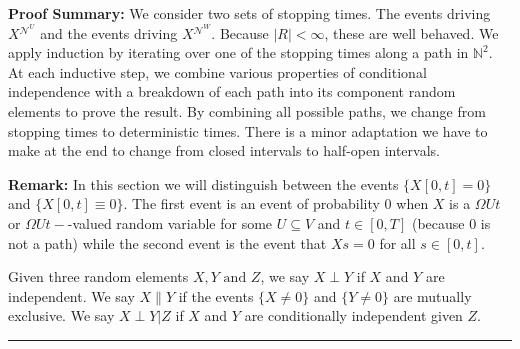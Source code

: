 \documentclass[12pt]{article}
\newcommand{\skipLine}{\vspace{12pt}}
\newcommand{\mb}{\mathbb}
\newcommand{\mc}{\mathcal}
\newcommand{\te}{\text}
\newcommand{\pfsum}{\textbf{Proof Summary: }}
\newcommand{\ind}{\hspace{24pt}}
\newcommand{\lin}{\rule{\linewidth}{0.4 pt}}
\renewcommand{\U}{U}							%
\newcommand{\UU}{W}								%
\newcommand{\UUU}{R}							%
\newcommand{\T}{T}								%
\renewcommand{\t}{t}							%
\renewcommand{\tt}{s}							%
\newcommand{\X}{X}								%
\newcommand{\neigh}{\mc{N}}						%
\newcommand{\vind}[1]{^{#1}}					%
\newcommand{\XX}{Y}								%
\newcommand{\XXX}{Z}							%
\newcommand{\mutex}{\|}							%
\begin{document}
\pfsum We consider two sets of stopping times. The events driving \(\X{}{}^{\neigh\vind{\U}}\) and the events driving \(\X{}{}^{\neigh\vind{\UU}}\). Because \(|\UUU| < \infty\), these are well behaved. We apply induction by iterating over one of the stopping times along a path in \(\mb{N}^2\). At each inductive step, we combine various properties of conditional independence with a breakdown of each path into its component random elements to prove the result. By combining all possible paths, we change from stopping times to deterministic times. There is a minor adaptation we have to make at the end to change from closed intervals to half-open intervals.

\skipLine

\textbf{Remark:} In this section we will distinguish between the events \(\{\X{}{[0,\t]} = 0\}\) and \(\{\X{}{[0,\t]}\equiv 0\}\). The first event is an event of probability 0 when \(\X{}{}\) is a \(\Omega{\U}{\t}\) or \(\Omega{\U}{\t-}\)-valued random variable for some \(\U\subseteq V\) and \(\t \in [0,\T]\) (because 0 is not a path) while the second event is the event that \(\X{}{\tt} = 0\) for all \(\tt \in [0,\t]\).

\ind Given three random elements \(\X{}{},\XX{}{} \te{ and } \XXX{}{}\), we say \(\X{}{}\perp \XX{}{}\) if \(\X{}{}\) and \(\XX{}{}\) are independent. We say \(\X{}{}\mutex \XX{}{}\) if the events \(\{\X{}{}\neq 0\}\) and \(\{\XX{}{} \neq 0\}\) are mutually exclusive. We say \(\X{}{}\perp \XX{}{}|\XXX{}{}\) if \(\X{}{}\) and \(\XX{}{}\) are conditionally independent given \(\XXX{}{}\).

\lin
\end{document}
